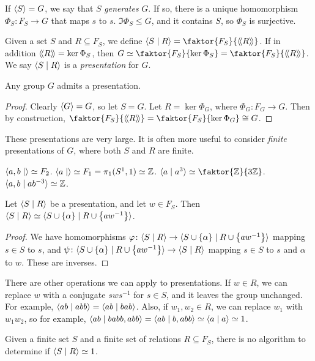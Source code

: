 If \( \langle{} S \rangle = G \), we say that \( S \) \emph{generates} \( G \).
If so, there is a unique homomorphism \( \Phi_S \colon F_S \to G \) that maps \( s \) to \( s \).
\( \Im \Phi_S \leq G \), and it contains \( S \), so \( \Phi_S \) is surjective.
\begin{definition}
	Given a set \( S \) and \( R \subseteq F_S \), we define \( \genset{S\mid R} = \faktor{F_S}{\ngenset R} \).
	If in addition \( \langle\!\langle{} R \rangle\!\rangle = \ker \Phi_S \), then \( G \simeq \faktor{F_S}{\ker \Phi_S} = \faktor{F_S}{\ngenset R} \).
	We say \( \langle{} S\mid R \rangle \) is a \emph{presentation} for \( G \).
\end{definition}
\begin{proposition}
	Any group \( G \) admits a presentation.
\end{proposition}
\begin{proof}
	Clearly \( \langle{} G \rangle = G \), so let \( S = G \).
	Let \( R = \ker \Phi_G \), where \( \Phi_G \colon F_G \to G \).
	Then by construction, \( \faktor{F_S}{\ngenset R} = \faktor{F_S}{\ker \Phi_G} \cong G \).
\end{proof}
\begin{remark}
	These presentations are very large.
	It is often more useful to consider \emph{finite} presentations of \( G \), where both \( S \) and \( R \) are finite.
\end{remark}
\begin{example}
	\( \langle{} a,b \mid \rangle \simeq F_2 \).
	\( \langle{} a \mid \rangle \simeq F_1 = \pi_1(S^1,1) \simeq \mathbb Z \).
	\( \genset{a \mid a^3} \simeq \faktor{\mathbb Z}{3\mathbb Z} \).
	\( \langle{} a, b \mid ab^{-3} \rangle \simeq \mathbb Z \).
\end{example}
\begin{proposition}
	Let \( \langle{} S\mid R \rangle \) be a presentation, and let \( w \in F_S \).
	Then \( \langle{} S \mid R \rangle \simeq \langle{} S \cup \qty{\alpha} \mid R \cup \qty{aw^{-1}} \rangle \).
\end{proposition}
\begin{proof}
	We have homomorphisms \( \varphi \colon \langle{} S \mid R \rangle \to \langle{} S \cup \qty{\alpha} \mid R \cup \qty{aw^{-1}} \rangle \) mapping \( s \in S \) to \( s \), and \( \psi \colon \langle{} S \cup \qty{\alpha} \mid R \cup \qty{aw^{-1}} \rangle \to \langle{} S \mid R \rangle \) mapping \( s \in S \) to \( s \) and \( \alpha \) to \( w \).
	These are inverses.
\end{proof}
There are other operations we can apply to presentations.
If \( w \in R \), we can replace \( w \) with a conjugate \( sws^{-1} \) for \( s \in S \), and it leaves the group unchanged.
For example, \( \langle{} ab \mid abb \rangle = \langle{} ab \mid bab \rangle \).
Also, if \( w_1, w_2 \in R \), we can replace \( w_1 \) with \( w_1w_2 \), so for example, \( \langle{} ab \mid babb, abb \rangle = \langle{} ab \mid b, abb \rangle \simeq \langle{} a \mid a \rangle \simeq 1 \).
\begin{theorem}
	Given a finite set \( S \) and a finite set of relations \( R \subseteq F_S \), there is no algorithm to determine if \( \langle{} S \mid R \rangle \simeq 1 \).
\end{theorem}

